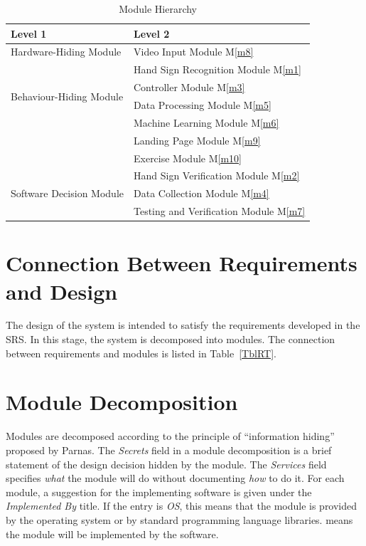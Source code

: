 \documentclass[12pt, titlepage]{article}
\newcommand{\mref}[1]{M\ref{#1}}
\begin{document}
\begin{table}[h!]
\centering
\begin{tabular}{p{} p{}}
\toprule
\textbf{Level 1} & \textbf{Level 2}\\
\midrule

\multirow{1}{0.3\textwidth}{Hardware-Hiding Module} 
& Video Input Module \mref{m8}\\
\midrule

\multirow{4}{0.3\textwidth}{Behaviour-Hiding Module} 
& Hand Sign Recognition Module \mref{m1}\\
& Controller Module \mref{m3}\\
& Data Processing Module \mref{m5}\\
& Machine Learning Module \mref{m6}\\
& Landing Page Module \mref{m9}\\
& Exercise Module \mref{m10}\\
\midrule

\multirow{3}{0.3\textwidth}{Software Decision Module} 
& Hand Sign Verification Module \mref{m2}\\
& Data Collection Module \mref{m4}\\
& Testing and Verification Module \mref{m7}\\
\bottomrule

\end{tabular}
\caption{Module Hierarchy}
\label{TblMH}
\end{table}

\section{Connection Between Requirements and Design} \label{SecConnection}

The design of the system is intended to satisfy the requirements developed in
the SRS. In this stage, the system is decomposed into modules. The connection
between requirements and modules is listed in Table~\ref{TblRT}.

\section{Module Decomposition} \label{SecMD}

Modules are decomposed according to the principle of ``information hiding''
proposed by Parnas. The \emph{Secrets} field in a module
decomposition is a brief statement of the design decision hidden by the
module. The \emph{Services} field specifies \emph{what} the module will do
without documenting \emph{how} to do it. For each module, a suggestion for the
implementing software is given under the \emph{Implemented By} title. If the
entry is \emph{OS}, this means that the module is provided by the operating
system or by standard programming language libraries.  \emph{\progname{}} means the
module will be implemented by the \progname{} software.
\end{document}
